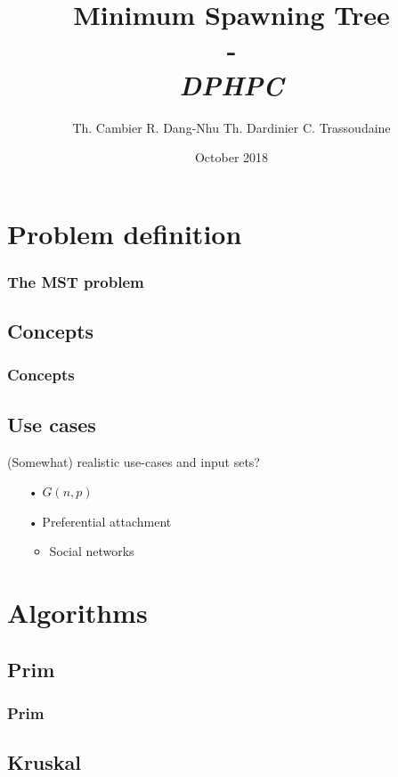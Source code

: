 \documentclass{beamer}
\institute[ETH Zürich]{\textbf{ETH Zürich}}
\date{October 2018}
\author{
    Th. Cambier
    R. Dang-Nhu
    Th. Dardinier
    C. Trassoudaine
}
\title{
	\textbf{Minimum Spawning Tree}\\
	-\\ 
	\textit{DPHPC}
}
\begin{document}
\frame{\titlepage}
\frame{\tableofcontents}



\section{Problem definition}
\begin{frame}
\frametitle{The MST problem}
\end{frame}

\subsection{Concepts}
\begin{frame}
\frametitle{Concepts}
\end{frame}

\subsection{Use cases}

\begin{frame}
(Somewhat) realistic use-cases and input sets?

\begin{itemize}
\item[•] $G(n, p)$
\item[•] Preferential attachment
	\begin{itemize}
	\item Social networks
	\end{itemize}
\end{itemize}
\end{frame}


\section{Algorithms}
\subsection{Prim}
\begin{frame}
\frametitle{Prim}
\end{frame}
\subsection{Kruskal}
\end{document}
